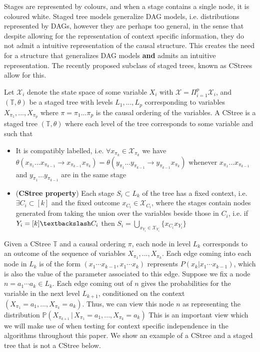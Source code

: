 \documentclass{tufte-book}
\begin{document}
Stages are represented by colours, and when a stage contains a single node, it is coloured white. Staged tree models generalize DAG models, i.e. distributions represented by DAGs, however they are perhaps too general, in the sense that despite allowing for the representation of context specific information, they do not admit a intuitive representation of the causal structure. This creates the need for a structure that generalizes DAG models \textbf{and} admits an intuitive representation. The recently proposed subclass of staged trees, known as CStrees allow for this.

\begin{definition}[CStrees]\label{def:cstree}
Let $\mathcal{X}_i$ denote the state space of some variable $X_i$ with $\mathcal{X} = \Pi_{i=1}^p \mathcal{X}_i$, and $(\mathbb{T},\theta)$ be a staged tree with levels $L_1,...,L_p$ corresponding to variables $X_{\pi_1},...,X_{\pi_p}$ where $\pi = \pi_1...\pi_p$ is the causal ordering of the variables.  
A CStree is a staged tree $(\mathbb{T}, \theta)$ where each level of the tree corresponds to some variable and  such that 
\begin{itemize}
\item It is compatibly labelled, i.e. $\forall x_{\pi_k} \in \mathcal{X}_{\pi_k}$ we have $\theta(x_{\pi_1}...x_{\pi_{k-1}}\rightarrow x_{\pi_{k-1}}x_{\pi_k}) = \theta(y_{\pi_1}...y_{\pi_{k-1}}\rightarrow y_{\pi_{k-1}}x_{\pi_k})$ whenever $x_{\pi_1}...x_{\pi_{k-1}}$ and $y_{\pi_1}...y_{\pi_{k-1}}$ are in the same stage
\item (\textbf{CStree property}) Each stage $S_i \subset L_k$ of the tree has a fixed context, i.e. $\exists C_i \subset [k]$ and the fixed outcome $x_{C_i} \in \mathcal{X}_{C_i}$, where the stages contain nodes generated from taking the union over the variables beside those in $C_i$, i.e. if $Y_i = [k] \textbackslash C_i$ then $S_i = \bigcup_{x_{Y_i} \in \mathcal{X}_{Y_i}} \{x_{C_i}x_{Y_i} \}$  
\end{itemize}
\end{definition}



Given a CStree \(\mathbb{T}\) and a causal ordering \(\pi\), each node in level \(L_k\) corresponds to an outcome of the sequence of variables \(X_{\pi_1},...,X_{\pi_k}\). Each edge coming into each node in \(L_k\) is of the form \((x_1\cdots x_{k-1},x_1\cdots x_k)\) represents \(P(x_{k}|x_1 \cdots x_{k-1})\), which is also the value of the parameter associated to this edge. Suppose we fix a node \(n = a_1\cdots a_k \in L_k\). Each edge coming out of \(n\) gives the probabilities for the variable in the next level \(L_{k+1}\), conditioned on the context \((X_{\pi_1}=a_1,...,X_{\pi_k}=a_k)\). Thus, we can view this node \(n\) as representing the distribution \(\mathbb{P}(X_{\pi_{k+1}}\,|\, X_{\pi_1}=a_1,...,X_{\pi_k}=a_k)\) This is an important view which we will make use of when testing for context specific independence in the algorithms throughout this paper. We show an example of a CStree and a staged tree that is not a CStree below.
\end{document}

